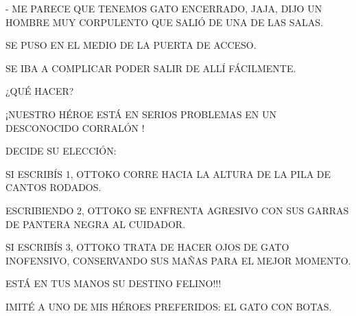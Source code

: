 - ME PARECE QUE TENEMOS GATO ENCERRADO, JAJA, DIJO UN HOMBRE MUY CORPULENTO QUE SALIÓ DE UNA DE LAS SALAS.


SE PUSO EN EL MEDIO DE \hspace{.2\textwidth} LA PUERTA DE ACCESO.
\newline\newline

\vspace{.2\textheight}
\begin{minipage}{.3\textwidth}
	SE IBA A COMPLICAR PODER SALIR DE ALLÍ FÁCILMENTE.
\end{minipage}
\hfill
\begin{minipage}{.3\textwidth}
	¿QUÉ HACER?
\end{minipage}






\newpage
{}
\begin{LARGE}¡NUESTRO HÉROE ESTÁ EN SERIOS PROBLEMAS EN UN DESCONOCIDO CORRALÓN
	!
	
	
	DECIDE SU ELECCIÓN:
\end{LARGE}
\newline

SI ESCRIBÍS 1, OTTOKO CORRE HACIA LA ALTURA DE LA PILA DE CANTOS RODADOS.

ESCRIBIENDO 2, OTTOKO SE ENFRENTA AGRESIVO CON SUS GARRAS DE PANTERA NEGRA AL CUIDADOR.

SI ESCRIBÍS 3, OTTOKO TRATA DE HACER OJOS DE GATO INOFENSIVO, CONSERVANDO SUS MAÑAS PARA EL MEJOR MOMENTO.
\newline		\newline
\begin{LARGE}
	
	
	ESTÁ EN TUS MANOS SU DESTINO FELINO!!!
\end{LARGE}



\newpage
{}
\newpage
{}
IMITÉ A UNO DE MIS  HÉROES PREFERIDOS: EL GATO CON BOTAS.	

